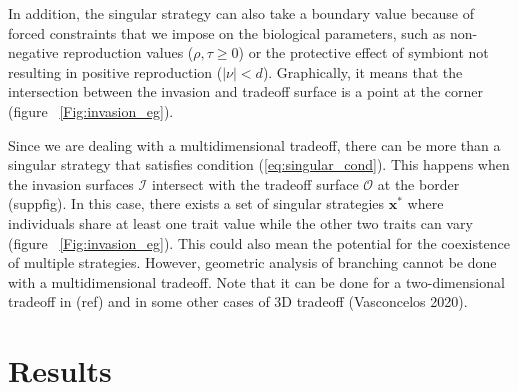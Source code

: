 \documentclass[11pt]{article}
\begin{document}
In addition, the singular strategy can also take a boundary value because of forced constraints that we impose on the biological parameters, such as non-negative reproduction values ($\rho, \tau \geq 0$) or the protective effect of symbiont not resulting in positive reproduction ($\mid \nu \mid < d$). 
Graphically, it means that the intersection between the invasion and tradeoff surface is a point at the corner (figure ~\ref{Fig:invasion_eg}). 

Since we are dealing with a multidimensional tradeoff, there can be more than a singular strategy that satisfies condition (\ref{eq:singular_cond}). 
This happens when the invasion surfaces $\mathcal{I}$ intersect with the tradeoff surface $\mathcal{O}$ at the border (suppfig). In this case, there exists a set of singular strategies $\mathbf{x}^*$ where individuals share at least one trait value while the other two traits can vary (figure ~\ref{Fig:invasion_eg}). This could also mean the potential for the coexistence of multiple strategies. 
However, geometric analysis of branching cannot be done with a multidimensional tradeoff. 
Note that it can be done for a two-dimensional tradeoff in (ref) and in some other cases of 3D tradeoff (Vasconcelos 2020).


\section*{Results}

%
%
%
%
\end{document}
